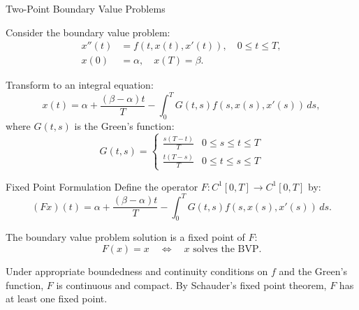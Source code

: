 \documentclass[aspectratio=169,10pt]{beamer}
\begin{document}
\begin{frame}[allowframebreaks]{Two-Point Boundary Value Problems}
  \begin{problem}
    Consider the boundary value problem:
    \begin{align}
      x''(t) &= f(t, x(t), x'(t)), \quad 0 \leq t \leq T, \\
      x(0) &= \alpha, \quad x(T) = \beta.
    \end{align}
  \end{problem}

  \vspace{0.3cm}

  \begin{solution}
    Transform to an integral equation:
    \[
      x(t) = \alpha + \frac{(\beta - \alpha)t}{T} - \int_0^T G(t,s) f(s, x(s), x'(s)) \, ds,
    \]
    where $G(t,s)$ is the Green's function:
    \[
      G(t,s) = \begin{cases}
        \frac{s(T-t)}{T} & 0 \leq s \leq t \leq T \\
        \frac{t(T-s)}{T} & 0 \leq t \leq s \leq T
      \end{cases}
    \]
  \end{solution}

  \framebreak

  \begin{block}{Fixed Point Formulation}
    Define the operator $F: C^1[0,T] \to C^1[0,T]$ by:
    \[
      (Fx)(t) = \alpha + \frac{(\beta - \alpha)t}{T} - \int_0^T G(t,s) f(s, x(s), x'(s)) \, ds.
    \]

    The boundary value problem solution is a fixed point of $F$:
    \[
      F(x) = x \quad \iff \quad x \text{ solves the BVP}.
    \]
  \end{block}

  \vspace{0.3cm}

  \begin{theorem}
    Under appropriate boundedness and continuity conditions on $f$ and the
    Green's function, $F$ is continuous and compact. By Schauder's fixed
    point theorem, $F$ has at least one fixed point.
  \end{theorem}
\end{frame}
\end{document}

